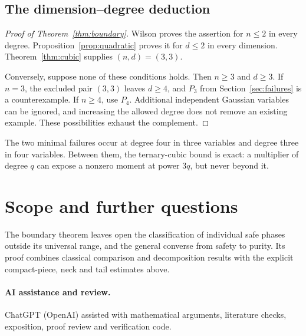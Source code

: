 \documentclass[11pt]{article}
\theoremstyle{definition}\newtheorem{definition}[theorem]{Definition}
\theoremstyle{remark}\newtheorem{remark}[theorem]{Remark}
\begin{document}
\subsection{The dimension--degree deduction}
\begin{proof}[Proof of Theorem~\ref{thm:boundary}]
Wilson proves the assertion for $n\leq2$ in every degree.
Proposition~\ref{prop:quadratic} proves it for $d\leq2$ in every
dimension. Theorem~\ref{thm:cubic} supplies $(n,d)=(3,3)$.

Conversely, suppose none of these conditions holds. Then $n\geq3$
and $d\geq3$. If $n=3$, the excluded pair $(3,3)$ leaves $d\geq4$,
and $P_3$ from Section~\ref{sec:failures} is a counterexample.
If $n\geq4$, use $P_4$. Additional independent Gaussian variables can
be ignored, and increasing the allowed degree does not remove an
existing example. These possibilities exhaust the complement.
\end{proof}

The two minimal failures occur at degree four in three variables and
degree three in four variables. Between them, the ternary-cubic bound
is exact: a multiplier of degree $q$ can expose a nonzero moment at
power $3q$, but never beyond it.

\section*{Scope and further questions}
The boundary theorem leaves open the classification of individual safe
phases outside its universal range, and the general converse from safety
to purity. Its proof combines classical comparison and decomposition
results with the explicit compact-piece, neck and tail estimates above.

\clearpage
\begingroup\small
{}
\paragraph{AI assistance and review.}
ChatGPT (OpenAI) assisted with mathematical arguments, literature checks,
exposition, proof review and verification code.
\end{document}
